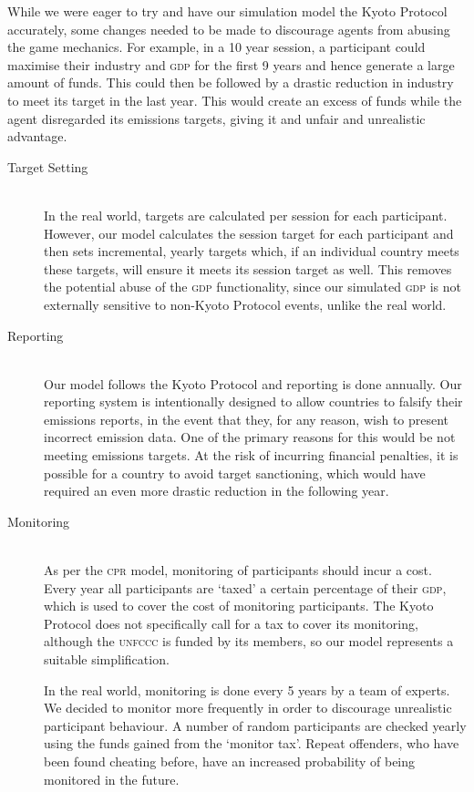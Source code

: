 While we were eager to try and have our simulation model the Kyoto Protocol accurately, some changes needed to be made to discourage agents from abusing the game mechanics. For example, in a 10 year session, a participant could maximise their industry and \textsc{gdp} for the first 9 years and hence generate a large amount of funds. This could then be followed by a drastic reduction in industry to meet its target in the last year. This would create an excess of funds while the agent disregarded its emissions targets, giving it and unfair and unrealistic advantage.

\begin{description}
\item [Target Setting] \hfill \\ 
In the real world, targets are calculated per session for each participant. However, our model calculates the session target for each participant and then sets incremental, yearly targets which, if an individual country meets these targets, will ensure it meets its session target as well. This removes the potential abuse of the \textsc{gdp} functionality, since our simulated \textsc{gdp} is not externally sensitive to non-Kyoto Protocol events, unlike the real world.

\item [Reporting] \hfill \\ 
Our model follows the Kyoto Protocol and reporting is done annually. Our reporting system is intentionally designed to allow countries to falsify their emissions reports, in the event that they, for any reason, wish to present incorrect emission data. One of the primary reasons for this would be not meeting emissions targets. At the risk of incurring financial penalties, it is possible for a country to avoid target sanctioning, which would have required an even more drastic reduction in the following year.

\item [Monitoring] \hfill \\ 
As per the \textsc{cpr} model, monitoring of participants should incur a cost. Every year all participants are `taxed' a certain percentage of their \textsc{gdp}, which is used to cover the cost of monitoring participants. The Kyoto Protocol does not specifically call for a tax to cover its monitoring, although the \textsc{unfccc} is funded by its members, so our model represents a suitable simplification.

In the real world, monitoring is done every 5 years by a team of experts. We decided to monitor more frequently in order to discourage unrealistic participant behaviour. A number of random participants are checked yearly using the funds gained from the `monitor tax'. Repeat offenders, who have been found cheating before, have an increased probability of being monitored in the future.


\end{description}
